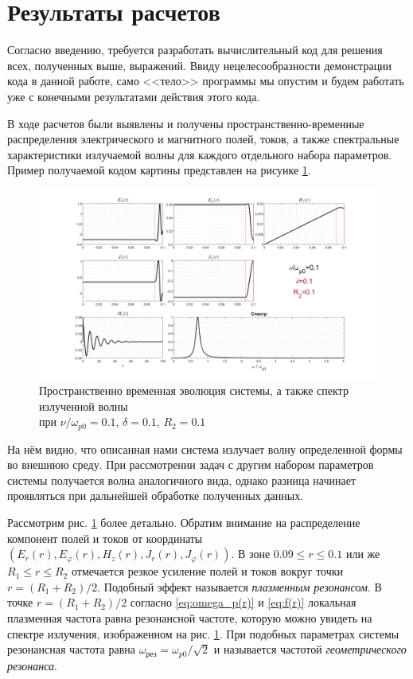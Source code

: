 \documentclass[a4paper]{article}
\begin{document}
\newpage
\section{Результаты расчетов}

Согласно введению,  требуется  разработать вычислительный код для решения всех, полученных выше, выражений. Ввиду нецелесообразности демонстрации кода в данной работе, само <<тело>> программы мы опустим и будем работать уже с конечными результатами действия этого кода.

В ходе расчетов были выявлены и получены пространственно-временные распределения электрического и магнитного полей, токов, а также спектральные характеристики излучаемой волны для каждого отдельного набора параметров. Пример получаемой кодом картины представлен на рисунке \ref{ris:matlab}.

\begin{figure}[H]\centering	
	\includegraphics[width=0.9\linewidth]{pics/picture_123}
	\caption{Пространственно временная эволюция системы, а также спектр излученной волны \\ при $\nu/\omega_{p0}=0.1$, $\delta=0.1$, $R_{2}=0.1$}
	\label{ris:matlab}
\end{figure}

На нём видно, что описанная нами система излучает волну определенной формы во внешнюю среду. При рассмотрении задач с другим набором параметров системы получается волна аналогичного вида, однако разница начинает проявляться при дальнейшей обработке полученных данных.

Рассмотрим рис. \ref{ris:matlab} более детально. Обратим внимание на распределение компонент полей и токов от координаты $\left(E_{r}(r),E_{\varphi}(r),H_{z}(r),J_{r}(r),J_{\varphi}(r)\right)$. В зоне $0.09\leq r\leq 0.1$ или же $R_{1}\leq r\leq R_{2}$ отмечается резкое усиление полей и токов вокруг точки $r=\left(R_{1}+R_{2}\right)/2$. Подобный эффект называется \textit{плазменным резонансом}. В точке $r=\left(R_{1}+R_{2}\right)/2$ согласно \eqref{eq:omega_p(r)} и \eqref{eq:f(r)} локальная плазменная частота равна резонансной частоте, которую можно увидеть на спектре излучения, изображенном на рис. \ref{ris:matlab}. При подобных параметрах системы резонансная частота равна $\omega_{\text{рез}}=\omega_{p0}/\sqrt{2}$ и называется частотой \textit{геометрического резонанса}.
\end{document}
